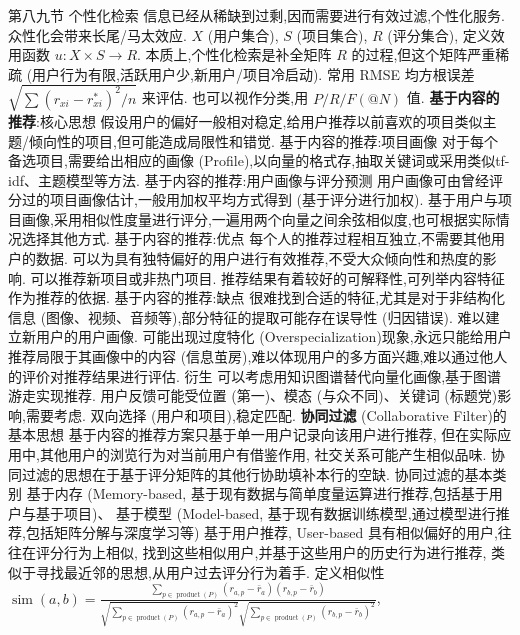 \documentclass[10pt, utf8]{ctexart}
\begin{document}
\begin{multicols}{4}
        {\color{orange_}第八九节 个性化检索}
    信息已经从稀缺到过剩,因而需要进行有效过滤,个性化服务.
    众性化会带来长尾/马太效应.
    $X$ (用户集合), $S$ (项目集合), $R$ (评分集合), 定义效用函数 $u:X\times S\to R$.
    本质上,个性化检索是补全矩阵 $R$ 的过程,但这个矩阵严重稀疏 (用户行为有限,活跃用户少,新用户/项目冷启动).
    常用 RMSE 均方根误差 $\sqrt{\sum{(r_{xi}-r_{xi}^{*})}^2/n}$ 来评估.
    也可以视作分类,用 $P/R/F(@N)$ 值.
    {\color{purple_}\textbf{基于内容的推荐}:核心思想}
    假设用户的偏好一般相对稳定,给用户推荐以前喜欢的项目类似主题/倾向性的项目,但可能造成局限性和错觉.
    {\color{blue}基于内容的推荐:项目画像}
    对于每个备选项目,需要给出相应的画像 (Profile),以向量的格式存,抽取关键词或采用类似tf-idf、主题模型等方法.
    {\color{blue}基于内容的推荐:用户画像与评分预测}
    用户画像可由曾经评分过的项目画像估计,一般用加权平均方式得到 (基于评分进行加权).
    基于用户与项目画像,采用相似性度量进行评分,一遍用两个向量之间余弦相似度,也可根据实际情况选择其他方式.
    {\color{blue}基于内容的推荐:优点}
    每个人的推荐过程相互独立,不需要其他用户的数据.
    可以为具有独特偏好的用户进行有效推荐,不受大众倾向性和热度的影响.
    可以推荐新项目或非热门项目.
    推荐结果有着较好的可解释性,可列举内容特征作为推荐的依据.
    {\color{blue}基于内容的推荐:缺点}
    很难找到合适的特征,尤其是对于非结构化信息 (图像、视频、音频等),部分特征的提取可能存在误导性 (归因错误).
    难以建立新用户的用户画像.
    可能出现过度特化 (Overspecialization)现象,永远只能给用户推荐局限于其画像中的内容 (信息茧房),难以体现用户的多方面兴趣,难以通过他人的评价对推荐结果进行评估.
    {\color{blue}衍生}
    可以考虑用知识图谱替代向量化画像,基于图谱游走实现推荐.
    用户反馈可能受位置 (第一)、模态 (与众不同)、关键词 (标题党)影响,需要考虑.
    双向选择 (用户和项目),稳定匹配.
    {\color{purple_}\textbf{协同过滤} (Collaborative Filter)的基本思想}
    基于内容的推荐方案只基于单一用户记录向该用户进行推荐,
    但在实际应用中,其他用户的浏览行为对当前用户有借鉴作用,
    社交关系可能产生相似品味.
    协同过滤的思想在于基于评分矩阵的其他行协助填补本行的空缺.
    {\color{blue}协同过滤的基本类别}
    基于内存 (Memory-based, 基于现有数据与简单度量运算进行推荐,包括基于用户与基于项目)、
    基于模型 (Model-based, 基于现有数据训练模型,通过模型进行推荐,包括矩阵分解与深度学习等)
    {\color{red}基于用户推荐, User-based}
    具有相似偏好的用户,往往在评分行为上相似,
    找到这些相似用户,并基于这些用户的历史行为进行推荐,
    类似于寻找最近邻的思想,从用户过去评分行为着手.
    定义相似性
    {\tiny$\operatorname{sim}(a, b)=\frac{\sum_{p \in \operatorname{product}(P)}\left(r_{a, p}-\bar{r}_{a}\right)\left(r_{b, p}-\bar{r}_{b}\right)}{\sqrt{\sum_{p \in \operatorname{product}(P)}{\left(r_{a, p}-\bar{r}_{a}\right)}^{2}} \sqrt{\sum_{p \in \operatorname{product}(P)}{\left(r_{b, p}-\bar{r}_{b}\right)}^{2}}}$},

\end{multicols}
\end{document}
